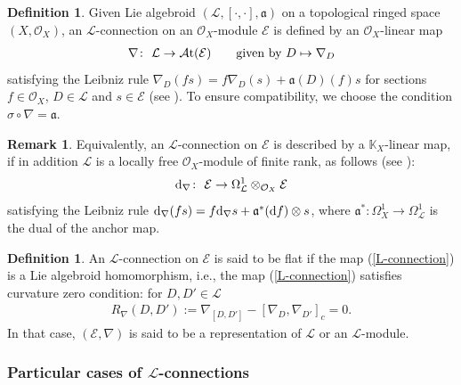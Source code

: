 \documentclass[pdftex]{sigma}
\numberwithin{equation}{section}
\theoremstyle{definition}
\newtheorem{Def}[Thm]{Definition}
\newtheorem{Rem}[Thm]{Remark}
\begin{document}
\begin{Def} \label{L-connections}
Given Lie algebroid $(\mathcal{L}, [\cdot, \cdot], \mathfrak{a})$ on a topological ringed space $(X, \mathcal{O}_X )$, an $\mathcal{L}$-connection on an $\mathcal{O}_X$-module $\mathcal{E}$ is defined by an $\mathcal{O}_X$-linear map
	\begin{align}\label{L-connection}
		\nabla\colon \ \mathcal{L}\rightarrow \mathcal{A}{\rm t}(\mathcal{E}) \qquad \text{given by} \ D\mapsto \nabla_D
	\end{align}
	satisfying the Leibniz rule $\nabla_D(f s)= f \nabla_D(s)+\mathfrak{a}(D)(f) s$ for sections $f \in \mathcal{O}_X$, $D \in \mathcal{L}$ and $s \in \mathcal{E}$ (see \cite{UB, BRT, MK, BP}). To ensure compatibility, we choose the condition $\sigma \circ \nabla= \mathfrak{a}$.
\end{Def}
\begin{Rem} \label{L-connection using dual}
	Equivalently, an $\mathcal{L}$-connection on $\mathcal{E}$ is described by a $\mathbb{K}_X$-linear map, if in addition $\mathcal{L}$ is a locally free $\mathcal{O}_X$-module of finite rank, as follows (see \cite{BRT, BP}):
\[
{\rm d}_{\nabla} \colon \ \mathcal{E} \rightarrow \Omega_{\mathcal{L}}^1 \otimes_{\mathcal{O}_X}\mathcal{E}
\] satisfying the Leibniz rule ${\rm d}_{\nabla}(fs)=f {\rm d}_{\nabla} s + {\mathfrak{a}^*}({\rm d}f)\otimes s$, where
	${\mathfrak{a}^*}\colon \Omega_X^1 \rightarrow \Omega_{\mathcal{L}}^1$ is the dual of the anchor map.
\end{Rem}

\begin{Def} \label{flat}
	An $\mathcal{L}$-connection on $\mathcal{E}$ is said to be flat if the map (\ref{L-connection}) is a Lie algebroid homomorphism, i.e., the map (\ref{L-connection}) satisfies curvature zero condition: for $D,D' \in \mathcal{L}$
	\begin{align*}%
		R_{\nabla}(D,D'):=\nabla_{[D,D']}-[\nabla_D, \nabla_{D'}]_c=0.
	\end{align*}
	In that case, $(\mathcal{E},\nabla)$ is said to be a representation of $\mathcal{L}$ or an $\mathcal{L}$-module.
\end{Def}

\subsubsection[Particular cases of L-connections]{Particular cases of $\boldsymbol{\mathcal{L}}$-connections}
\end{document}
